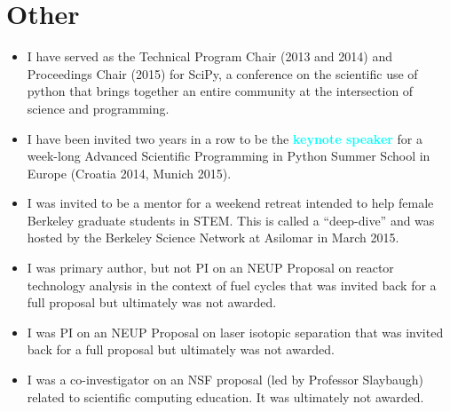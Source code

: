 \documentclass[a4paper, 10pt]{article}
\newcommand{\myitem}[1]{\item[\textcolor{gray}{\textbf{#1}}]}
\newcommand{\boldblue}[1]{\textcolor{cyan}{\textbf{#1}}}
\begin{document}
\section*{Other}
\begin{itemize}
\myitem{SciPy} I have served as the Technical Program Chair (2013 and 2014) and 
Proceedings Chair (2015) for SciPy, a conference on the scientific use of 
python that brings together an entire community at the intersection of science 
and programming.
\myitem{ASPP School} I have been invited two years in a row to be the 
\boldblue{keynote speaker} for a week-long Advanced Scientific Programming in 
Python Summer School in Europe (Croatia 2014, Munich 2015).
\myitem{BSN Deep Dive} I was invited to be a mentor for a weekend 
retreat intended to help female Berkeley graduate students in STEM.  This is 
called a ``deep-dive'' and was hosted by the Berkeley Science Network at 
Asilomar in March 2015.
\myitem{NEUP 2013 Proposal} I was primary author, but not PI on an NEUP 
Proposal on reactor technology analysis in the context of fuel cycles that was 
invited back for a full proposal but ultimately was not awarded.  
\myitem{NEUP 2014 Proposal} I was PI on an NEUP Proposal on laser isotopic 
separation that was invited back for a full proposal but ultimately was not 
awarded.
\myitem{NSF 2014 Proposal} I was a co-investigator on an NSF proposal (led by 
Professor Slaybaugh) related to scientific computing education. It was ultimately not 
awarded.
\end{itemize}


\end{document}
